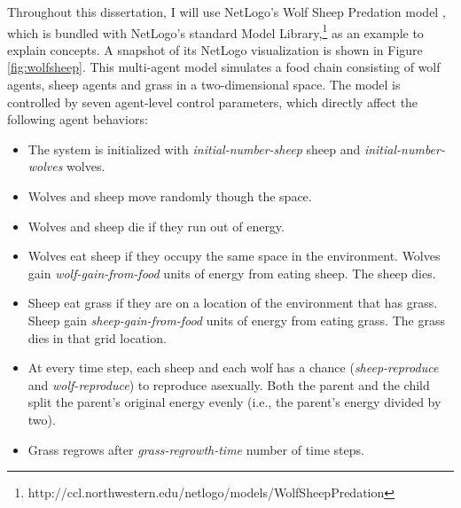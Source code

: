 Throughout this dissertation, I will use NetLogo's Wolf Sheep Predation model \cite{wolfsheep}, which is bundled with NetLogo's standard Model Library,\footnote{http://ccl.northwestern.edu/netlogo/models/WolfSheepPredation} as an example to explain concepts.
A snapshot of its NetLogo visualization is shown in Figure \ref{fig:wolfsheep}.
This multi-agent model simulates a food chain consisting of wolf agents, sheep agents and grass in a two-dimensional space.
The model is controlled by seven agent-level control parameters, which directly affect the following agent behaviors:
\begin{itemize}
  \item The system is initialized with \textit{initial-number-sheep} sheep and \textit{initial-number-wolves} wolves.
  \item Wolves and sheep move randomly though the space.
  \item Wolves and sheep die if they run out of energy.
  \item Wolves eat sheep if they occupy the same space in the environment. Wolves gain \textit{wolf-gain-from-food} units of energy from eating sheep. The sheep dies.
  \item Sheep eat grass if they are on a location of the environment that has grass. Sheep gain \textit{sheep-gain-from-food} units of energy from eating grass. The grass dies in that grid location.
  \item At every time step, each sheep and each wolf has a chance (\textit{sheep-reproduce} and \textit{wolf-reproduce}) to reproduce asexually. Both the parent and the child split the parent's original energy evenly (i.e., the parent's energy divided by two).
  \item Grass regrows after \textit{grass-regrowth-time} number of time steps.
\end{itemize}

